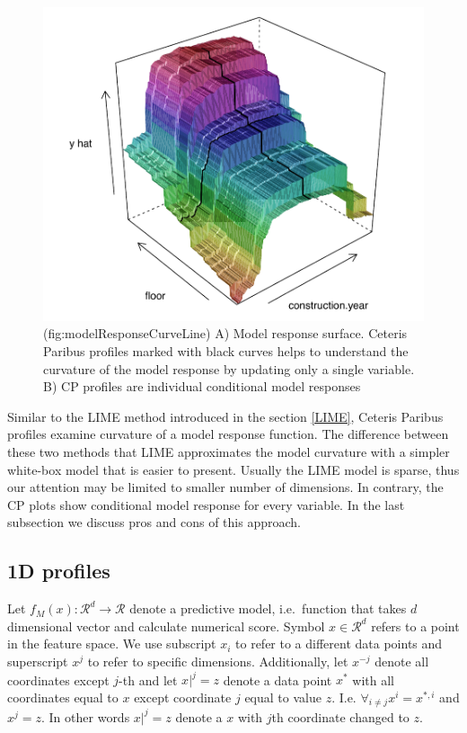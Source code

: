 \documentclass[]{krantz}
\theoremstyle{definition}
\theoremstyle{definition}
\theoremstyle{definition}
\theoremstyle{remark}
\begin{document}
\begin{figure}

{\centering \includegraphics[width=0.7\linewidth]{figure/model_response_line} 

}

\caption{(fig:modelResponseCurveLine) A) Model response surface. Ceteris Paribus profiles marked with black curves helps to understand the curvature of the model response by updating only a single variable. B) CP profiles are individual conditional model responses}\label{fig:modelResponseCurveLine}
\end{figure}

Similar to the LIME method introduced in the section \ref{LIME}, Ceteris
Paribus profiles examine curvature of a model response function. The
difference between these two methods that LIME approximates the model
curvature with a simpler white-box model that is easier to present.
Usually the LIME model is sparse, thus our attention may be limited to
smaller number of dimensions. In contrary, the CP plots show conditional
model response for every variable. In the last subsection we discuss
pros and cons of this approach.

\hypertarget{ceterisParibus1d}{%
\subsection{1D profiles}\label{ceterisParibus1d}}

Let \(f_{M}(x): \mathcal R^{d} \rightarrow \mathcal R\) denote a
predictive model, i.e.~function that takes \(d\) dimensional vector and
calculate numerical score. Symbol \(x \in \mathcal R^d\) refers to a
point in the feature space. We use subscript \(x_i\) to refer to a
different data points and superscript \(x^j\) to refer to specific
dimensions. Additionally, let \(x^{-j}\) denote all coordinates except
\(j\)-th and let \(x|^j=z\) denote a data point \(x^*\) with all
coordinates equal to \(x\) except coordinate \(j\) equal to value \(z\).
I.e. \(\forall_{i \neq {j}} x^i = x^{*,i}\) and \(x^j = z\). In other
words \(x|^j=z\) denote a \(x\) with \(j\)th coordinate changed to
\(z\).
\end{document}
